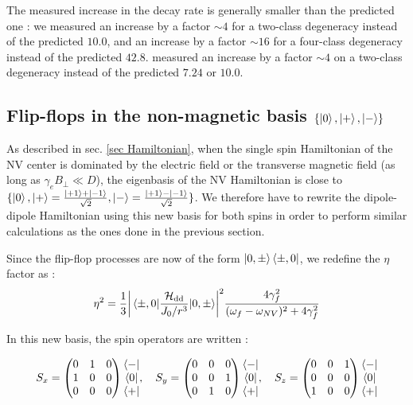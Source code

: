 \documentclass[preprintnumbers,amsmath,amssymb,onecolumn,12pt]{revtex4-2}
\begin{document}
The measured increase in the decay rate is generally smaller than the predicted one : we measured an increase by a factor $\sim 4$ for a two-class degeneracy instead of the predicted $10.0$, and an increase by a factor $\sim 16$ for a four-class degeneracy instead of the predicted $42.8$. \cite{choi_depolarization_2017} measured an increase by a factor $\sim 4$ on a two-class degeneracy instead of the predicted $7.24$ or $10.0$.

\subsection{Flip-flops in the non-magnetic basis $\{ \ket{0},\ket{+},\ket{-} \} $}

As described in sec. \ref{sec Hamiltonian}, when the single spin Hamiltonian of the NV center is dominated by the electric field or the transverse magnetic field (as long as $\gamma_e B_\perp \ll D$), the eigenbasis of the NV Hamiltonian is close to $\{\ket{0},\ket{+}=\frac{\ket{+1}+\ket{-1}}{\sqrt{2}},\ket{-}=\frac{\ket{+1}-\ket{-1}}{\sqrt{2}} \} $. We therefore have to rewrite the dipole-dipole Hamiltonian using this new basis for both spins in order to perform similar calculations as the ones done in the previous section.

Since the flip-flop processes are now of the form $\ket{0,\pm}\bra{\pm,0}$, we redefine the $\eta$ factor as :
\begin{equation}
\eta^2=\frac{1}{3} \abs{\mel{\pm ,0}{\frac{\mathcal{H}_{\rm dd}}{J_0/r^3}}{0,\pm }}^2  \frac{4\gamma_f^2}{(\omega_f - \omega_{NV})^2+4\gamma_f^2}
\end{equation}

In this new basis, the spin operators are written :

\begin{equation}
  S_x = \begin{pmatrix}
  0&1&0 \\
  1&0&0 \\
  0&0&0
  \end{pmatrix}
  \begin{matrix}
  \bra{-} \\
  \bra{0} \\
  \bra{+}
  \end{matrix}  
  , \quad 
 S_y = \begin{pmatrix}
  0&0&0 \\
  0&0&1 \\
  0&1&0
  \end{pmatrix}
  \begin{matrix}
  \bra{-} \\
  \bra{0} \\
  \bra{+}
  \end{matrix}  
 , \quad 
  S_z = \begin{pmatrix}
  0&0&1 \\
  0&0&0\\
  1&0&0
  \end{pmatrix}
  \begin{matrix}
  \bra{-} \\
  \bra{0} \\
  \bra{+}
  \end{matrix}
  \end{equation}
\end{document}
